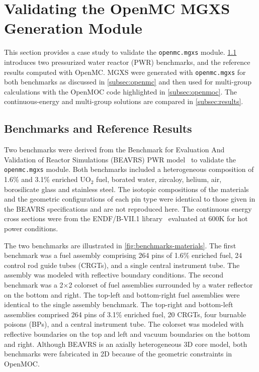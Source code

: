 \section{Validating the OpenMC MGXS Generation Module}
\label{sec:validate}

This section provides a case study to validate the \texttt{openmc.mgxs} module. \cref{subsec:benchmarks} introduces two pressurized water reactor (PWR) benchmarks, and the reference results computed with OpenMC. MGXS were generated with \texttt{openmc.mgxs} for both benchmarks as discussed in \cref{subsec:openmc} and then used for multi-group calculations with the OpenMOC code highlighted in \cref{subsec:openmoc}. The continuous-energy and multi-group solutions are compared in \cref{subsec:results}.


\subsection{Benchmarks and Reference Results}
\label{subsec:benchmarks}

Two benchmarks were derived from the Benchmark for Evaluation And Validation of Reactor Simulations (BEAVRS) PWR model~\cite{horelik2013beavrs} to validate the \texttt{openmc.mgxs} module. Both benchmarks included a heterogeneous composition of 1.6\% and 3.1\% enriched UO$_2$ fuel, borated water, zircaloy, helium, air, borosilicate glass and stainless steel. The isotopic compositions of the materials and the geometric configurations of each pin type were identical to those given in the BEAVRS specifications and are not reproduced here. The continuous energy cross sections were from the ENDF/B-VII.1 library~\cite{mcnpx2003manual} evaluated at 600K for hot power conditions.

The two benchmarks are illustrated in \cref{fig:benchmarks-materials}. The first benchmark was a fuel assembly comprising 264 pins of 1.6\% enriched fuel, 24 control rod guide tubes (CRGTs), and a single central instrument tube. The assembly was modeled with reflective boundary conditions. The second benchmark was a 2$\times$2 colorset of fuel assemblies surrounded by a water reflector on the bottom and right. The top-left and bottom-right fuel assemblies were identical to the single assembly benchmark. The top-right and bottom-left assemblies comprised 264 pins of 3.1\% enriched fuel, 20 CRGTs, four burnable poisons (BPs), and a central instrument tube. The colorset was modeled with reflective boundaries on the top and left and vacuum boundaries on the bottom and right. Although BEAVRS is an axially heterogeneous 3D core model, both benchmarks were fabricated in 2D because of the geometric constraints in OpenMOC.


